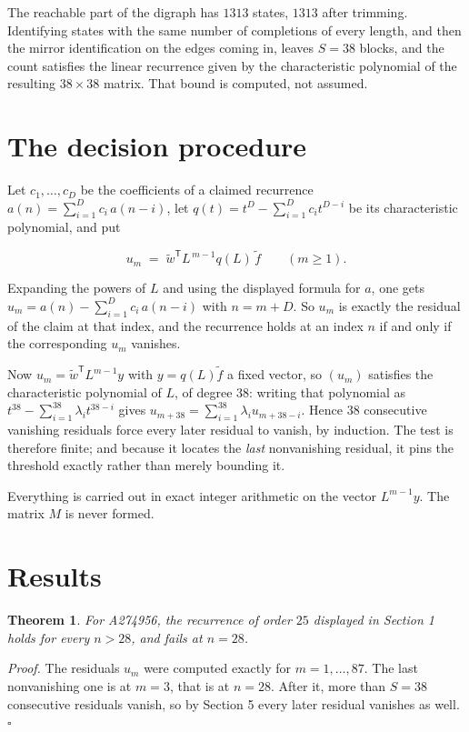 \documentclass[11pt]{article}
\newtheorem{theorem}{Theorem}
\theoremstyle{definition}
\begin{document}
The reachable part of the digraph has $1313$ states, $1313$ after trimming. Identifying states with the same number of completions of every length, and then the mirror identification on the edges coming in, leaves $S = 38$ blocks, and the count satisfies the linear recurrence given by the characteristic polynomial of the resulting $38\times38$ matrix. That bound is computed, not assumed.

\section{The decision procedure}

Let $c_1,\dots,c_D$ be the coefficients of a claimed recurrence $a(n) = \sum_{i=1}^{D} c_i\,a(n-i)$, let $q(t) = t^{D} - \sum_{i=1}^{D} c_i t^{D-i}$ be its characteristic polynomial, and put

\[u_m \;=\; \tilde w^{\mathsf T} L^{\,m-1} q(L)\,\tilde f \qquad (m \ge 1).\]

Expanding the powers of $L$ and using the displayed formula for $a$, one gets $u_m = a(n) - \sum_{i=1}^{D} c_i\,a(n-i)$ with $n = m + D$. So $u_m$ is exactly the residual of the claim at that index, and the recurrence holds at an index $n$ if and only if the corresponding $u_m$ vanishes.

Now $u_m = \tilde w^{\mathsf T} L^{m-1} y$ with $y = q(L)\tilde f$ a fixed vector, so $(u_m)$ satisfies the characteristic polynomial of $L$, of degree $38$: writing that polynomial as $t^{38} - \sum_{i=1}^{38} \lambda_i t^{38-i}$ gives $u_{m+38} = \sum_{i=1}^{38} \lambda_i u_{m+38-i}$. Hence $38$ consecutive vanishing residuals force every later residual to vanish, by induction. The test is therefore finite; and because it locates the {\itshape last} nonvanishing residual, it pins the threshold exactly rather than merely bounding it.

Everything is carried out in exact integer arithmetic on the vector $L^{m-1}y$. The matrix $M$ is never formed.

\section{Results}

\begin{theorem} For A274956, the recurrence of order $25$ displayed in Section 1 holds for every $n > 28$, and fails at $n = 28$.\end{theorem}

{\itshape Proof.} The residuals $u_m$ were computed exactly for $m = 1,\dots,87$. The last nonvanishing one is at $m = 3$, that is at $n = 28$. After it, more than $S = 38$ consecutive residuals vanish, so by Section 5 every later residual vanishes as well. $\square$
\end{document}
